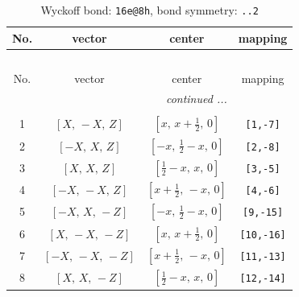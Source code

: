 \documentclass[fleqn,8pt]{jsarticle}
\begin{document}
\begin{longtable}{cccc}
\caption{Wyckoff bond: {\tt 16e@8h}, bond symmetry: {\tt ..2}}
 \\
 \hline \hline
No. & vector & center & mapping \\ \hline \endfirsthead

\multicolumn{3}{l}{\tablename\ \thetable{}} \\
 \hline \hline
No. & vector & center & mapping \\ \hline \endhead

 \hline \hline
\multicolumn{3}{r}{\footnotesize\it continued ...} \\ \endfoot

 \hline \hline
\multicolumn{3}{r}{} \\ \endlastfoot

1 & $\left[ X,\, - X,\, Z \right]$ & $\left[ x,\, x + \frac{1}{2},\, 0 \right]$ & {\tt [1,-7]} \\ \hline
2 & $\left[ - X,\, X,\, Z \right]$ & $\left[ - x,\, \frac{1}{2} - x,\, 0 \right]$ & {\tt [2,-8]} \\ \hline
3 & $\left[ X,\, X,\, Z \right]$ & $\left[ \frac{1}{2} - x,\, x,\, 0 \right]$ & {\tt [3,-5]} \\ \hline
4 & $\left[ - X,\, - X,\, Z \right]$ & $\left[ x + \frac{1}{2},\, - x,\, 0 \right]$ & {\tt [4,-6]} \\ \hline
5 & $\left[ - X,\, X,\, - Z \right]$ & $\left[ - x,\, \frac{1}{2} - x,\, 0 \right]$ & {\tt [9,-15]} \\ \hline
6 & $\left[ X,\, - X,\, - Z \right]$ & $\left[ x,\, x + \frac{1}{2},\, 0 \right]$ & {\tt [10,-16]} \\ \hline
7 & $\left[ - X,\, - X,\, - Z \right]$ & $\left[ x + \frac{1}{2},\, - x,\, 0 \right]$ & {\tt [11,-13]} \\ \hline
8 & $\left[ X,\, X,\, - Z \right]$ & $\left[ \frac{1}{2} - x,\, x,\, 0 \right]$ & {\tt [12,-14]} \\
\end{longtable}
\renewcommand{\arraystretch}{1.2}
\end{document}
